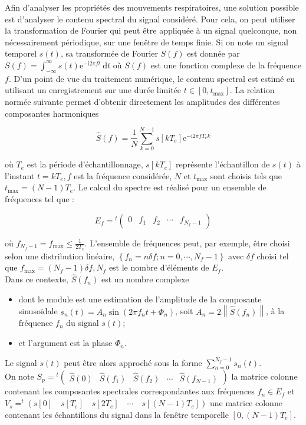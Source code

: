 Afin d'analyser les propriétés des mouvements respiratoires, une solution possible est d'analyser le contenu spectral du signal considéré. Pour cela, on peut utiliser la transformation de Fourier qui peut être appliquée à un signal quelconque, non nécessairement périodique, sur une fenêtre de temps finie. Si on note un signal temporel $s(t)$, sa transformée de Fourier $S(f)$ est donnée par $S(f)=\int_{-\infty}^{\infty} s(t) \mathrm{e}^{-\mathrm{i} 2 \pi f t} \mathrm{~d} t$ où $S(f)$ est une fonction complexe de la fréquence $f$. D'un point de vue du traitement numérique, le contenu spectral est estimé en utilisant un enregistrement sur une durée limitée $t \in\left[0, t_{\max }\right]$. La relation normée suivante permet d'obtenir directement les amplitudes des différentes composantes harmoniques

$$
\hat{S}(f)=\frac{1}{N} \sum_{k=0}^{N-1} s\left[k T_{e}\right] \mathrm{e}^{-\mathrm{i} 2 \pi f T_{e} k}
$$

où $T_{e}$ est la période d'échantillonnage, $s\left[k T_{e}\right]$ représente l'échantillon de $s(t)$ à l'instant $t=k T_{e}, f$ est la fréquence considérée, $N$ et $t_{\max }$ sont choisis tels que $t_{\max }=(N-1) T_{e}$. Le calcul du spectre est réalisé pour un ensemble de fréquences tel que :

$$
E_{f}={ }^{t}\left(\begin{array}{lllll}
0 & f_{1} & f_{2} & \cdots & f_{N_{f}-1}
\end{array}\right)
$$

où $f_{N_{f}-1}=f_{\max } \leqslant \frac{1}{2 T_{e}}$. L'ensemble de fréquences peut, par exemple, être choisi selon une distribution linéaire, $\left\{f_{n}=n \delta f ; n=0, \cdots, N_{f}-1\right\}$ avec $\delta f$ choisi tel que $f_{\max }=\left(N_{f}-1\right) \delta f, N_{f}$ est le nombre d'éléments de $E_{f}$.\\
Dans ce contexte, $\hat{S}\left(f_{n}\right)$ est un nombre complexe

\begin{itemize}
  \item dont le module est une estimation de l'amplitude de la composante sinusoïdale $s_{n}(t)=A_{n} \sin \left(2 \pi f_{n} t+\Phi_{n}\right)$, soit $A_{n}=2\left\|\hat{S}\left(f_{n}\right)\right\|$, à la fréquence $f_{n}$ du signal $s(t)$;
  \item et l'argument est la phase $\Phi_{n}$.
\end{itemize}

Le signal $s(t)$ peut être alors approché sous la forme $\sum_{n=0}^{N_{f}-1} s_{n}(t)$.\\
On note $S_{p}={ }^{t}\left(\begin{array}{lllll}\hat{S}(0) & \hat{S}\left(f_{1}\right) & \hat{S}\left(f_{2}\right) & \cdots & \hat{S}\left(f_{N-1}\right)\end{array}\right)$ la matrice colonne contenant les composantes spectrales correspondantes aux fréquences $f_{n} \in E_{f}$ et $V_{s}=^{t}\left(s[0] \quad s\left[T_{e}\right] \quad s\left[2 T_{e}\right] \quad \cdots \quad s\left[(N-1) T_{e}\right]\right)$ une matrice colonne contenant les échantillons du signal dans la fenêtre temporelle $\left[0,(N-1) T_{e}\right]$.\\

